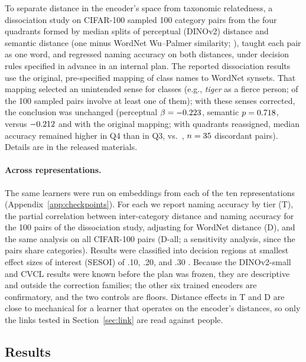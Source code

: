 \documentclass[11pt]{article}
\begin{document}
To separate distance in the encoder's space from taxonomic relatedness, a dissociation study on CIFAR-100 sampled 100 category pairs from the four quadrants formed by median splits of perceptual (DINOv2) distance and semantic distance (one minus WordNet Wu--Palmer similarity; \cite{wu1994,miller1995}), taught each pair as one word, and regressed naming accuracy on both distances, under decision rules specified in advance in an internal plan. The reported dissociation results use the original, pre-specified mapping of class names to WordNet synsets. That mapping selected an unintended sense for \WnNCorrected{} classes (e.g., \emph{tiger} as a fierce person; \WnNTouch{} of the 100 sampled pairs involve at least one of them); with these senses corrected, the conclusion was unchanged (perceptual $\beta = -0.223$, semantic $p = 0.718$, versus $-0.212$ and \WnFrozenPsem{} with the original mapping; with quadrants reassigned, median accuracy remained higher in Q4 than in Q3, \WnCorrQFour{} vs.\ \WnCorrQThree, $n = 35$ discordant pairs). Details are in the released materials.

\paragraph{Across representations.} The same learners were run on embeddings from each of the ten representations (Appendix~\ref{app:checkpoints}). For each we report naming accuracy by tier (T), the partial correlation between inter-category distance and naming accuracy for the 100 pairs of the dissociation study, adjusting for WordNet distance (D), and the same analysis on all \VtDallN{} CIFAR-100 pairs (D-all; a sensitivity analysis, since the pairs share categories). Results were classified into decision regions at smallest effect sizes of interest (SESOI) of .10, .20, and .30 \parencite{schuirmann1987,lakens2017}. Because the DINOv2-small and CVCL results were known before the plan was frozen, they are descriptive and outside the correction families; the other six trained encoders are confirmatory, and the two controls are floors. Distance effects in T and D are close to mechanical for a learner that operates on the encoder's distances, so only the links tested in Section~\ref{sec:link} are read against people.


\subsection{Results}
\end{document}
